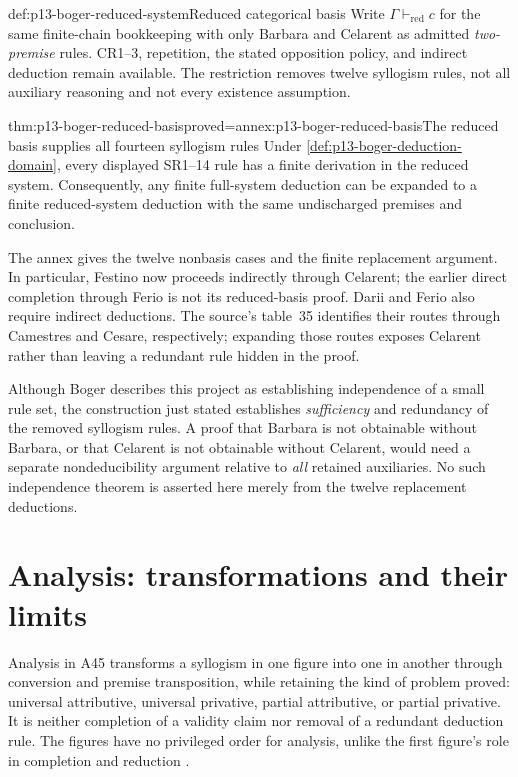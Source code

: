 \begin{hbdefinition}{def:p13-boger-reduced-system}{Reduced categorical basis}
Write \(\Gamma\vdash_{\mathrm{red}}c\) for the same finite-chain bookkeeping
with only Barbara and Celarent as admitted \emph{two-premise} rules.
CR1--3, repetition, the stated opposition policy, and indirect deduction
remain available. The restriction removes twelve syllogism rules, not all
auxiliary reasoning and not every existence assumption.
\end{hbdefinition}

\begin{hbtheorem}{thm:p13-boger-reduced-basis}{proved=annex:p13-boger-reduced-basis}{The reduced basis supplies all fourteen syllogism rules}
Under \cref{def:p13-boger-deduction-domain}, every displayed SR1--14 rule
has a finite derivation in the reduced system. Consequently, any finite
full-system deduction can be expanded to a finite reduced-system deduction
with the same undischarged premises and conclusion.
\end{hbtheorem}

The annex gives the twelve nonbasis cases and the finite replacement argument.
In particular, Festino now proceeds indirectly through Celarent; the earlier
direct completion through Ferio is not its reduced-basis proof. Darii and
Ferio also require indirect deductions. The source's table~35 identifies their
routes through Camestres and Cesare, respectively; expanding those routes
exposes Celarent rather than leaving a redundant rule hidden in the proof.

Although Boger describes this project as establishing independence of a small
rule set, the construction just stated establishes \emph{sufficiency} and
redundancy of the removed syllogism rules. A proof that Barbara is not obtainable
without Barbara, or that Celarent is not obtainable without Celarent, would
need a separate nondeducibility argument relative to \emph{all} retained
auxiliaries. No such independence theorem is asserted here merely from the
twelve replacement deductions.

\section{Analysis: transformations and their limits}
\label{sec:p13-boger-analysis}

Analysis in A45 transforms a syllogism in one figure into one in another
through conversion and premise transposition, while retaining the kind of
problem proved: universal attributive, universal privative, partial
attributive, or partial privative. It is neither completion of a validity claim
nor removal of a redundant deduction rule. The figures have no privileged
order for analysis, unlike the first figure's role in completion and reduction
\parencite[pp.~214--216, 241]{Boger2004UnderlyingLogic}.

